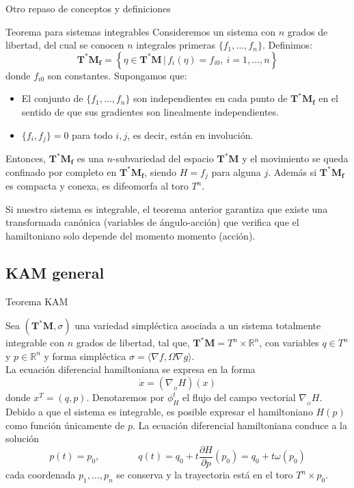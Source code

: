 \documentclass[8pt]{beamer}
\renewcommand{\>}{\rangle}
\newcommand{\<}{\langle}
\newcommand{\be}{\begin{equation}}
\newcommand{\ee}{\end{equation}}
\begin{document}
\begin{frame}{Otro repaso de conceptos y definiciones}

\begin{mybox}{Teorema para sistemas integrables}
Consideremos un sistema con $n$ grados de libertad, del cual se conocen $n$ integrales primeras $\{f_{1}, \ldots, f_{n}\}$. Definimos:
\be 
	\mathbf{T^{\ast}M_{f}} = \left\lbrace \eta \in \mathbf{T^{\ast}M}\, | \, f_{i}(\eta) = f_{i0}, \ i=1, \ldots, n \right\rbrace \nonumber
\ee
donde $f_{i0}$ son constantes. Supongamos que:
\begin{itemize}
\item El conjunto de $\{f_{1}, \ldots, f_{n}\}$ son independientes en cada punto de $\mathbf{T^{\ast}M_{f}}$ en el sentido de que sus gradientes son linealmente independientes.
\item $\{f_{i}, f_{j} \}=0$ para todo $i,j$, es decir, están en involución.
\end{itemize}
Entonces, $\mathbf{T^{\ast}M_{f}}$ es una $n$-subvariedad del espacio $\mathbf{T^{\ast}M}$ 
y el movimiento se queda confinado por completo en $\mathbf{T^{\ast}M_{f}}$, siendo $H = f_{j}$ para alguna $j$. Además si $\mathbf{T^{\ast}M_{f}}$ es compacta y conexa, es difeomorfa al toro $T^{n}$.
\end{mybox}

Si nuestro sistema es integrable, el teorema anterior garantiza que existe una transformada canónica (variables de ángulo-acción) que verifica que el hamiltoniano solo depende del momento momento (acción).
\end{frame}


\subsection[KAM general]{KAM general}

\begin{frame}{Teorema KAM}

Sea $(\mathbf{T^{\ast}M},\sigma)$ una variedad simpléctica asociada a un sistema totalmente integrable con $n$ grados de libertad, tal que, $\mathbf{T^{\ast}M} = T^{n} \times \mathbb{R}^{n}$, con variables $q\in T^{n}$ y $p \in \mathbb{R}^{n}$ y forma simpléctica $\sigma = \<\nabla f, \Omega \nabla g \>$. \\[10pt]

La ecuación diferencial hamiltoniana se expresa en la forma $$\dot{x} = \left(\nabla_{{}_{\Omega}}H\right)(x)$$ donde $x^{T} = (q,p)$. Denotaremos por $\phi_{H}^{t}$ el flujo del campo vectorial $\nabla_{{}_{\Omega}}H$.\\[10pt]

Debido a que el sistema es integrable, es posible expresar el hamiltoniano $H(p)$ como función únicamente de $p$. La ecuación diferencial hamiltoniana conduce a la solución
\be 
	p(t) = p_{0}, \qquad  \qquad
	q(t) = q_{0} + t \frac{\partial H}{\partial p}(p_{0}) = q_{0} + t \omega(p_{0}) 
	\nonumber
\ee 
cada coordenada $p_{1}, \ldots, p_{n}$ se conserva y la trayectoria está en el toro $T^{n} \times p_{0}$.

\end{frame}
\end{document}
